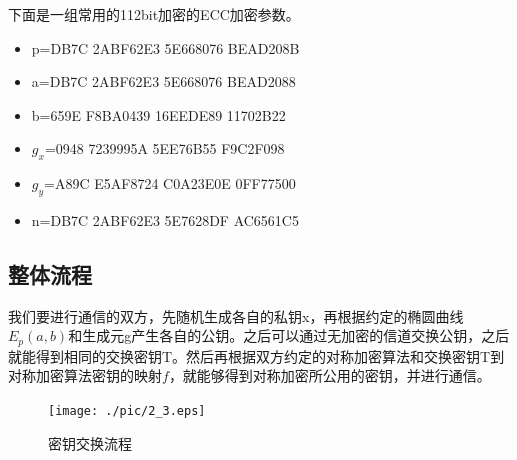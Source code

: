 下面是一组常用的112bit加密的ECC加密参数。

\begin{itemize}
    \item p=DB7C 2ABF62E3 5E668076 BEAD208B
    \item a=DB7C 2ABF62E3 5E668076 BEAD2088
    \item b=659E F8BA0439 16EEDE89 11702B22
    \item $g_x$=0948 7239995A 5EE76B55 F9C2F098
    \item $g_y$=A89C E5AF8724 C0A23E0E 0FF77500
    \item n=DB7C 2ABF62E3 5E7628DF AC6561C5
\end{itemize}

\subsection{整体流程}

我们要进行通信的双方，先随机生成各自的私钥x，再根据约定的椭圆曲线$E_p(a,b)$和生成元g产生各自的公钥。之后可以通过无加密的信道交换公钥，之后就能得到相同的交换密钥T。然后再根据双方约定的对称加密算法和交换密钥T到对称加密算法密钥的映射$f$，就能够得到对称加密所公用的密钥，并进行通信。

\begin{figure}[h]
	\centering
		\texttt{[image: ./pic/2\_3.eps]}
	\caption{密钥交换流程}
\end{figure}
